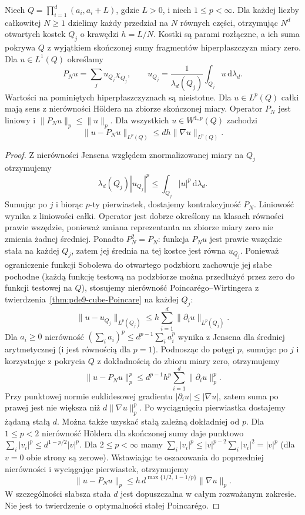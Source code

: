 \begin{lemat}
\label{lem:pde10-cube-approx}
Niech $Q=\prod_{i=1}^d(a_i,a_i+L)$, gdzie $L>0$,
i niech $1\le p<\infty$. Dla każdej liczby całkowitej
$N\ge1$ dzielimy
każdy przedział na $N$ równych części, otrzymując
$N^d$ otwartych kostek $Q_j$ o krawędzi $h=L/N$.
Kostki są parami rozłączne, a ich suma pokrywa $Q$
z wyjątkiem skończonej sumy fragmentów hiperpłaszczyzn
miary zero. Dla $u\in L^1(Q)$ określamy
\[
 P_Nu=\sum_j u_{Q_j}\chi_{Q_j},\qquad
 u_{Q_j}=\frac{1}{\lambda_d(Q_j)}
         \int_{Q_j}u\,\mathrm d\lambda_d.
\]
Wartości na pominiętych hiperpłaszczyznach są nieistotne.
Dla $u\in L^p(Q)$ całki mają sens z nierówności Höldera
na zbiorze skończonej miary. Operator $P_N$ jest liniowy
i $\|P_Nu\|_p\le\|u\|_p$.
Dla wszystkich $u\in W^{1,p}(Q)$ zachodzi
\[
 \|u-P_Nu\|_{L^p(Q)}\le dh\|\nabla u\|_{L^p(Q)}.
\]
\end{lemat}
\begin{proof}
Z nierówności Jensena względem znormalizowanej miary
na $Q_j$ otrzymujemy
\[
 \lambda_d(Q_j)|u_{Q_j}|^p
 \le\int_{Q_j}|u|^p\,\mathrm d\lambda_d.
\]
Sumując po $j$ i biorąc $p$-ty pierwiastek, dostajemy
kontrakcyjność $P_N$. Liniowość wynika z liniowości
całki. Operator jest dobrze określony na klasach
równości prawie wszędzie, ponieważ zmiana reprezentanta
na zbiorze miary zero nie zmienia żadnej średniej.
Ponadto $P_N^2=P_N$: funkcja $P_Nu$ jest prawie wszędzie
stała na każdej $Q_j$, zatem jej średnia na tej kostce
jest równa $u_{Q_j}$. Ponieważ ograniczenie funkcji
Sobolewa do otwartego podzbioru zachowuje jej słabe
pochodne (każdą funkcję testową na podzbiorze można
przedłużyć przez zero do funkcji testowej na $Q$),
stosujemy nierówność Poincarégo--Wirtingera
z twierdzenia~\ref{thm:pde9-cube-Poincare} na każdej $Q_j$:
\[
 \|u-u_{Q_j}\|_{L^p(Q_j)}
 \le h\sum_{i=1}^d\|\partial_i u\|_{L^p(Q_j)}.
\]
Dla $a_i\ge0$ nierówność
$(\sum_i a_i)^p\le d^{p-1}\sum_i a_i^p$
wynika z Jensena dla średniej arytmetycznej
(i jest równością dla $p=1$).
Podnosząc do potęgi $p$, sumując po $j$ i korzystając
z pokrycia $Q$ z dokładnością do zbioru miary zero,
otrzymujemy
\[
 \|u-P_Nu\|_p^p\le d^{p-1}h^p
                       \sum_{i=1}^d\|\partial_i u\|_p^p.
\]
Przy punktowej normie euklidesowej gradientu
$|\partial_i u|\le|\nabla u|$, zatem suma po prawej
jest nie większa niż $d\|\nabla u\|_p^p$.
Po wyciągnięciu pierwiastka dostajemy żądaną stałą $d$.
Można także uzyskać stałą zależną dokładniej od $p$.
Dla $1\le p<2$ nierówność Höldera dla skończonej sumy
daje punktowo
$\sum_i|v_i|^p\le d^{1-p/2}|v|^p$.
Dla $2\le p<\infty$ mamy
$\sum_i|v_i|^p\le |v|^{p-2}\sum_i|v_i|^2=|v|^p$
(dla $v=0$ obie strony są zerowe).
Wstawiając te oszacowania do poprzedniej nierówności
i wyciągając pierwiastek, otrzymujemy
\[
 \|u-P_Nu\|_p\le
 h\,d^{\max\{1/2,\,1-1/p\}}\|\nabla u\|_p.
\]
W szczególności słabsza stała $d$ jest dopuszczalna
w całym rozważanym zakresie. Nie jest to twierdzenie
o optymalności stałej Poincarégo.
\end{proof}

